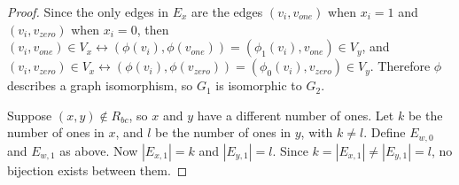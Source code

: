 \documentclass{article}
\theoremstyle{definition}
\begin{document}
\begin{proof}
  Since the only edges in $E_x$ are the edges $(v_i, v_{one})$ when $x_i=1$ and
  $(v_i, v_{zero})$ when $x_i=0$, then $(v_i, v_{one})\in V_x \leftrightarrow
  (\phi(v_i), \phi(v_{one}))=(\phi_1(v_i), v_{one})\in V_y$, and $(v_i,
  v_{zero})\in V_x \leftrightarrow (\phi(v_i), \phi(v_{zero})) = (\phi_0(v_i),
  v_{zero})\in V_y$. Therefore $\phi$ describes a graph isomorphism, so $G_1$
  is isomorphic to $G_2$.
  
  Suppose $(x,y)\notin R_{bc}$, so $x$ and $y$ have a different number of
  ones. Let $k$ be the number of ones in $x$, and $l$ be the number of ones in
  $y$, with $k\neq l$. Define $E_{w,0}$ and $E_{w,1}$ as above. Now
  $|E_{x,1}|=k$ and $|E_{y,1}|=l$. Since $k=|E_{x,1}|\neq|E_{y,1}|=l$, no
  bijection exists between them. 
\end{proof}
\end{document}
